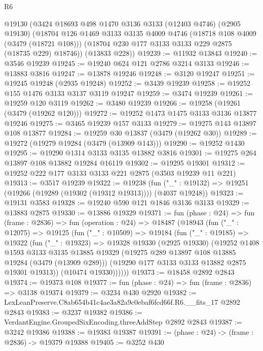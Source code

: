 \begin{lexlean}{R6}
\begin{coremodule}
    @19130
    (@3424
      @18693
      @498
      @1470
      @3136
      @3133
      (@12403 @4746)
      (@2905 @19130)
      (@18704
        @126
        @1469
        @3133
        @3135
        @4009
        @4746
        (@18718 @108 @4009 (@3479 (@18721 @108)))
        (@18704 @230 @177 @3133 @3133 @229 @2875 (@18735 @229) @18746))
      (@13833 @228))
@19239 := @11932 @13843
@19240 := @3546 @19239
@19245 := @19240 @624 @121 @2786 @3214 @3133
@19246 := @13883 @3816
@19247 := @13878 @19246
@19248 := @3120 @19247
@19251 := @19245 @19248 (@2935 @19248)
@19252 := @3439 @19239
@19258 := @19252 @155 @1476 @3133 @3137 @3119 @19247
@19259 := @3474 @19239
@19261 := @19259 @120 @3119
@19262 := @3480 @19239
@19266 := @19258 (@19261 (@3479 (@19262 @120)))
@19272 := @19252 @1473 @1475 @3133 @3136 @13877 @19246
@19275 := @3465 @19239 @157 @3133
@19279 := @19275 @143 @13897 @108 @13877
@19284 := @19259 @30 @13837 (@3479 (@19262 @30))
@19289 := @19272 (@19279 @19284 (@3479 (@13909 @143)))
@19290 := @19252 @1430
@19295 := @19290 @1314 @3133 @3135 @13882 @3816
@19301 := @19275 @264 @13897 @108 @13882 @19284 @16119
@19302 := @19295 @19301
@19312 := @19252 @222 @177 @3133 @3133 @221 @2875 (@3503 @19239 @11 @221)
@19313 := @3517 @19239
@19322 := @19238
    (fun ("_" : @19132) => @19251 (@19266 (@19289 (@19302 (@19312 @19313)))) (@4037 @19248))
@19323 := @19131 @3583
@19328 := @19240 @590 @121 @1846 @3136 @3133
@19329 := @13883 @2875
@19330 := @13886 @19329
@19371 := fun (phase : @24) =>
  fun (frame : @2836) =>
  fun (operation : @24) =>
  @18487
    (@18943
      (fun ("_" : @12075) =>
      @19125
        (fun ("_" : @10509) =>
        @19184
          (fun ("_" : @19185) =>
          @19322
            (fun ("_" : @19323) =>
            @19328
              @19330
              (@2925 @19330)
              (@19252
                @1408
                @1593
                @3133
                @3135
                @13885
                @19329
                (@19275 @289 @13897 @108 @13885 @19284 (@3479 (@13909 @289)))
                (@19290 @177 @3133 @3133 @13882 @2875 @19301 @19313))
              (@10474 @19330))))))
@19373 := @18458 @2892 @2843
@19374 := @19373 @108
@19377 := fun (phase : @24) => fun (frame : @2836) => @3138 @19374
@19379 := @3234 @430 @2920
@19382 := LexLeanPreserve.C8ab654b41c4ae3a82a9c0ebaf6fcd66f.R6.__fits_17 @2892 @2843
@19383 := @3237 @19382
@19386 := VerdantEngine.GroupedSixEncoding.threeAddStep @2892 @2843
@19387 := @3242 @19386
@19388 := @19383 @19387
@19391 := (phase : @24) -> (frame : @2836) -> @19379 @19388
@19405 := @3252
    @430

\end{coremodule}
\end{lexlean}
